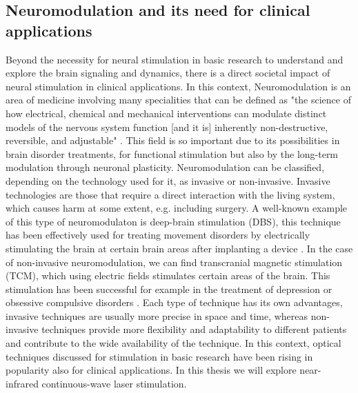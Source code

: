 \subsection{Neuromodulation and its need for clinical applications}


Beyond the necessity for neural stimulation in basic research to understand and explore the brain signaling and dynamics, there is a direct societal impact of neural stimulation in clinical applications. In this context, Neuromodulation is an area of medicine involving many specialities that can be defined as "the science of how electrical, chemical and mechanical interventions can modulate distinct models of the nervous system function [and it is] inherently non-destructive, reversible, and adjustable" \parencite{krames_neuromodulation_2009}. This field is so important due to its possibilities in brain disorder treatments, for functional stimulation but also by the long-term modulation through neuronal plasticity. Neuromodulation can be classified, depending on the technology used for it, as invasive or non-invasive. Invasive technologies are those that require a direct interaction with the living system, which causes harm at some extent, e.g. including surgery. A well-known example of this type of neuromodulaton is deep-brain stimulation (DBS), this technique has been effectively used for treating movement disorders by electrically stimulating the brain at certain brain areas after implanting a device \parencite{limousin_longterm_2019, hariz_deep_2022}. In the case of non-invasive neuromodulation, we can find transcranial magnetic stimulation (TCM), which using electric fields stimulates certain areas of the brain. This stimulation has been successful for example in the treatment of depression or obsessive compulsive disorders  \parencite{valero-cabre_transcranial_2017, clarke_patients_2018}. Each type of technique has its own advantages, invasive techniques are usually more precise in space and time, whereas non-invasive techniques provide more flexibility and adaptability to different patients and contribute to the wide availability of the technique. In this context, optical techniques discussed for stimulation in basic research have been rising in popularity also for clinical applications. In this thesis we will explore near-infrared continuous-wave laser stimulation. 












